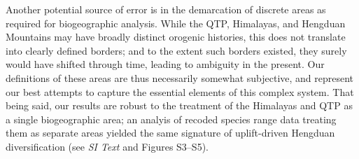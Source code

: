 Another potential source of error is in the demarcation of discrete
areas as required for biogeographic analysis. While the QTP,
Himalayas, and Hengduan Mountains may have broadly distinct orogenic
histories, this does not translate into clearly defined borders; and
to the extent such borders existed, they surely would have shifted
through time, leading to ambiguity in the present. Our definitions of
these areas are thus necessarily somewhat subjective, and represent
our best attempts to capture the essential elements of this complex
system. That being said, our results are robust to the treatment of
the Himalayas and QTP as a single biogeographic area; an analyis of
recoded species range data treating them as separate areas yielded the
same signature of uplift-driven Hengduan diversification (see
\textit{SI Text} and Figures S3--S5).








